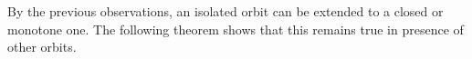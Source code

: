 \documentclass[10pt,a4paper]{article}
\theoremstyle{definition}
\theoremstyle{remark}
\newtheorem{observation}[tw]{Observation}
\newcommand \Z {\mathbb{Z}}
\begin{document}

\medskip
By the previous observations,  an isolated orbit can be extended to a closed or monotone one.
The following theorem shows that this remains true in presence of other orbits.
\end{document}
